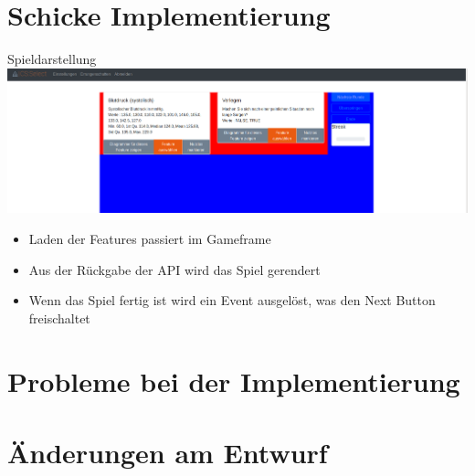 \documentclass[xcolor=dvipsnames]{beamer}
\begin{document}
\section{Schicke Implementierung}
\begin{frame}{Spieldarstellung}
\includegraphics[width=\textwidth]{../img/gameframe.png}
\begin{itemize}
    \item Laden der Features passiert im Gameframe
    \item Aus der Rückgabe der API wird das Spiel gerendert
    \item Wenn das Spiel fertig ist wird ein Event ausgelöst, was den Next Button freischaltet
\end{itemize}
\end{frame}

\section{Probleme bei der Implementierung}

\section{Änderungen am Entwurf}
\end{document}
